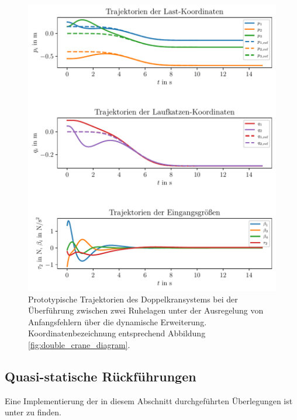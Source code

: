 \begin{figure}[H]
	\begin{center}
		\includegraphics[scale=1]{Pictures/dyn_controller_initial_error}
	\end{center}
	\caption[Trajektorien Ruhelagenüberführung mit Regelung über dynamische Erweiterung]
	{Prototypische Trajektorien des Doppelkransystems bei der Überführung zwischen zwei Ruhelagen unter der Ausregelung von Anfangsfehlern über die dynamische Erweiterung. Koordinatenbezeichnung entsprechend Abbildung \ref{fig:double_crane_diagram}.}
	\label{fig_dyn_controller_initial_error}
\end{figure}

\subsection{Quasi-statische Rückführungen}
\label{sec:quasi_static_control}
Eine Implementierung der in diesem Abschnitt durchgeführten Überlegungen ist unter \cite[flatness\_notebooks/ODE\_flatness\_trajectory\_control\_simulation\_qstat.ipynb]{SAGithub} zu finden.

